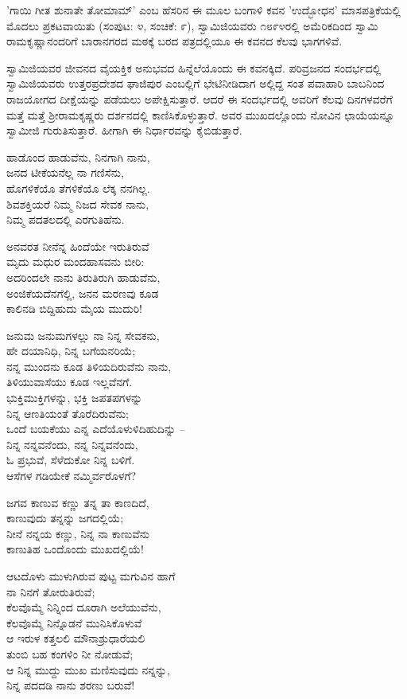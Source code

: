 'ಗಾಯಿ ಗೀತ ಶುನಾತೇ ತೋಮಾಮ್' ಎಂಬ ಹೆಸರಿನ ಈ ಮೂಲ ಬಂಗಾಳಿ ಕವನ 'ಉದ್ಭೋಧನ' ಮಾಸಪತ್ರಿಕೆಯಲ್ಲಿ ಮೊದಲು ಪ್ರಕಟವಾಯಿತು (ಸಂಪುಟ: ೪, ಸಂಚಿಕೆ: ೯), ಸ್ವಾಮಿಜಿಯವರು ೧೮೯೪ರಲ್ಲಿ ಅಮೆರಿಕದಿಂದ ಸ್ವಾಮಿ ರಾಮಕೃಷ್ಣಾನಂದರಿಗೆ ಬಾರಾನಗರದ ಮಠಕ್ಕೆ ಬರದ ಪತ್ರದಲ್ಲಿಯೂ ಈ ಕವನದ ಕೆಲವು ಭಾಗಗಳಿವೆ.

ಸ್ವಾಮಿಜಿಯವರ ಜೀವನದ ವೈಯಕ್ತಿಕ ಅನುಭವದ ಹಿನ್ನೆಲೆಯೊಂದು ಈ ಕವನಕ್ಕಿದೆ. ಪರಿವ್ರಜನದ ಸಂದರ್ಭದಲ್ಲಿ ಸ್ವಾಮಿಜಿಯವರು ಉತ್ತರಪ್ರದೇಶದ ಘಾಜಿಪುರ ಎಂಬಲ್ಲಿಗೆ ಭೇಟಿನೀಡಿದಾಗ ಅಲ್ಲಿದ್ದ ಸಂತ ಪವಾಹಾರಿ ಬಾಬನಿಂದ ರಾಜಯೋಗದ ದೀಕ್ಷೆಯನ್ನು ಪಡೆಯಲು ಅಪೇಕ್ಷಿಸುತ್ತಾರೆ. ಆದರೆ ಈ ಸಂದರ್ಭದಲ್ಲಿ ಅವರಿಗೆ ಕೆಲವು ದಿನಗಳವರೆಗೆ ಮತ್ತೆ ಮತ್ತೆ ಶ‍್ರೀರಾಮಕೃಷ್ಣರು ದರ್ಶನದಲ್ಲಿ ಕಾಣಿಸಿಕೊಳ್ಳುತ್ತಾರೆ. ಅವರ ಮುಖದಲ್ಲೊಂದು ನೋವಿನ ಛಾಯೆಯನ್ನೂ ಸ್ವಾಮೀಜಿ ಗುರುತಿಸುತ್ತಾರೆ. ಹೀಗಾಗಿ ಈ ನಿರ್ಧಾರವನ್ನು ಕೈಬಿಡುತ್ತಾರೆ.

ಹಾಡೊಂದ ಹಾಡುವೆನು, ನಿನಗಾಗಿ ನಾನು,\\ಜನದ ಟೀಕೆಯನೆಲ್ಲ ನಾ ಗಣಿಸೆನು,\\ಹೊಗಳಿಕೆಯೊ ತೆಗಳಿಕೆಯೊ ಲೆಕ್ಕ ನನಗಿಲ್ಲ.\\ಶಿವಶಕ್ತಿಯರೆ ನಿಮ್ಮ ನಿಜದ ಸೇವಕ ನಾನು,\\ನಿಮ್ಮ ಪದತಲದಲ್ಲಿ ಎರಗುತಿಹೆನು.

ಅನವರತ ನೀನೆನ್ನ ಹಿಂದೆಯೇ ಇರುತಿರುವೆ\\ಮೃದು ಮಧುರ ಮಂದಹಾಸವನು ಬೀರಿ:\\ಅದರಿಂದಲೇ ನಾನು ತಿರುತಿರುಗಿ ಹಾಡುವೆನು,\\ಅಂಜಿಕೆಯದೆನಗೆಲ್ಲಿ, ಜನನ ಮರಣವು ಕೂಡ\\ಕಾಲಿನಡಿ ಬಿದ್ದಿಹುದು ಮೈಯ ಮುದುರಿ!

ಜನುಮ ಜನುಮಗಳಲ್ಲು ನಾ ನಿನ್ನ ಸೇವಕನು,\\ಹೇ ದಯಾನಿಧಿ, ನಿನ್ನ ಬಗೆಯನರಿಯೆ;\\ನನ್ನ ಮುಂದನು ಕೂಡ ತಿಳಿಯದಿರುವೆನು ನಾನು,\\ತಿಳಿಯುವಾಸೆಯು ಕೂಡ ಇಲ್ಲವೆನಗೆ.\\ಭುಕ್ತಿಮುಕ್ತಿಗಳನ್ನು, ಭಕ್ತಿ ಜಪತಪಗಳನ್ನು\\ನಿನ್ನ ಆಣತಿಯಂತೆ ತೊರೆದಿರುವೆನು;\\ಒಂದೆ ಬಯಕೆಯು ಎನ್ನ ಎದೆಯೊಳುಳಿದಿಹುದಿನ್ನು –\\ನಿನ್ನ ನನ್ನವನೆಂದು, ನನ್ನ ನಿನ್ನವನೆಂದು,\\ಓ ಪ್ರಭುವೆ, ಸೆಳೆದುಕೋ ನಿನ್ನ ಬಳಿಗೆ.\\ಆಸೆಗಳ ಗಡಿಯೇಕೆ ನಮ್ಮಿರ್ವರೊಳಗೆ?

ಜಗವ ಕಾಣುವ ಕಣ್ಣು ತನ್ನ ತಾ ಕಾಣದಿದೆ,\\ಕಾಣುವುದು ತನ್ನನ್ನು ಜಗದಲ್ಲಿಯೆ;\\ನೀನೆ ನನ್ನಯ ಕಣ್ಣು, ನಿನ್ನ ನಾ ಕಾಣುವೆನು\\ಕಾಣುತಿಹ ಒಂದೊಂದು ಮುಖದಲ್ಲಿಯೆ!

ಆಟದೊಳು ಮುಳುಗಿರುವ ಪುಟ್ಟ ಮಗುವಿನ ಹಾಗೆ\\ನಾ ನಿನಗೆ ತೋರುತಿರುವೆ;\\ಕೆಲವೊಮ್ಮೆ ನಿನ್ನಿಂದ ದೂರಾಗಿ ಅಲೆಯುವೆನು,\\ಕೆಲವೊಮ್ಮೆ ನಿನ್ನೊಡನೆ ಮುನಿಸಿಕೊಳುವೆ\\ಆ ಇರುಳ ಕತ್ತಲಲಿ ಮೌನಾಶ್ರುಧಾರೆಯಲಿ\\ತುಂಬಿ ಬಹ ಕಂಗಳಿಂ ನೀ ನೋಡುವೆ;\\ಆ ನಿನ್ನ ಮುದ್ದು ಮುಖ ಮಣಿಸುವುದು ನನ್ನನ್ನು,\\ನಿನ್ನ ಪದದಡಿ ನಾನು ಶರಣು ಬರುವೆ!


